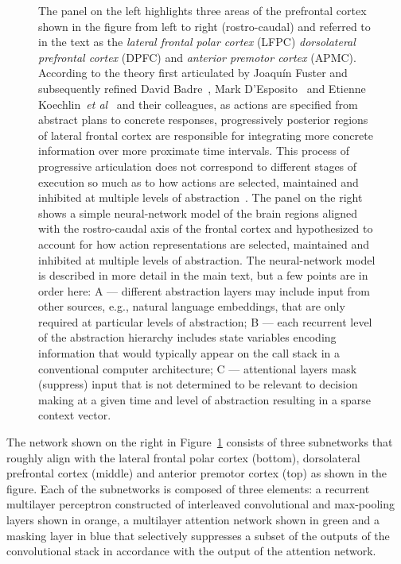 \documentclass[letterpaper,11pt]{article}
\def\colorred#1{{\color{red}#1}}
\def\urlh#1{{}}
\def\emdash{---}
\def\etal{{\em{et al}}}
\begin{document}
\begin{figure}
{    The panel on the left highlights three areas of the prefrontal cortex shown in the figure from left to right (rostro-caudal) and referred to in the text as the {\it{lateral frontal polar cortex}} (\colorred{LFPC}) {\it{dorsolateral prefrontal cortex}} (\colorred{DPFC}) and {\it{anterior premotor cortex}} (\colorred{APMC}). According to the theory first articulated by Joaqu\'{i}n Fuster and subsequently refined David Badre~\cite{BadreandWagnerNEURON-04}, Mark D'Esposito~\cite{DEspositoetalNATURE-95} and Etienne Koechlin~\etal~\cite{KoechlinetalSCIENCE-03} and their colleagues, as actions are specified from abstract plans to concrete responses, progressively posterior regions of lateral frontal cortex are responsible for integrating more concrete information over more proximate time intervals. This process of progressive articulation does not correspond to different stages of execution so much as to how actions are selected, maintained and inhibited at multiple levels of abstraction~\cite{BadreTiCS-08}. The panel on the right shows a simple neural-network model of the brain regions aligned with the rostro-caudal axis of the frontal cortex and hypothesized to account for how action representations are selected, maintained and inhibited at multiple levels of abstraction. The neural-network model is described in more detail in the main text, but a few points are in order here: {\colorred{A}} {\emdash{}} different abstraction layers may include input from other sources, e.g., natural language embeddings, that are only required at particular levels of abstraction; {\colorred{B}} {\emdash{}} each recurrent level of the abstraction hierarchy includes state variables encoding information that would typically appear on the call stack in a conventional computer architecture; {\colorred{C}} {\emdash{}} attentional layers mask (suppress) input that is not determined to be relevant to decision making at a given time and level of abstraction resulting in a sparse context vector.}
%
  \label{fig_prefer}
%
\end{figure}


The network shown on the right in Figure~{\urlh{#fig_Prefrontal_Hierarchy_Biology_Technology}{\ref{fig_prefer}}} consists of three subnetworks that roughly align with the {\urlh{https://en.wikipedia.org/wiki/Frontal_lobe}{lateral frontal polar cortex}} (bottom), {\urlh{https://en.wikipedia.org/wiki/Dorsolateral_prefrontal_cortex}{dorsolateral prefrontal cortex}} (middle) and {\urlh{https://en.wikipedia.org/wiki/Premotor_cortex}{anterior premotor cortex}} (top) as shown in the figure. Each of the subnetworks is composed of three elements: a recurrent multilayer perceptron constructed of interleaved convolutional and max-pooling layers shown in orange, a multilayer attention network shown in green and a masking layer in blue that selectively suppresses a subset of the outputs of the convolutional stack in accordance with the output of the attention network.
\end{document}
